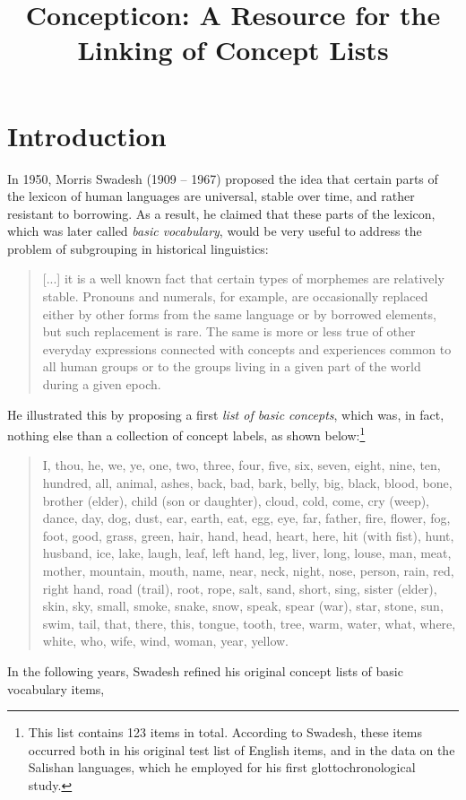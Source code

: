 \documentclass[10pt, a4paper]{article}
\title{Concepticon: A Resource for the Linking of Concept Lists}
\begin{document}
\maketitleabstract

\section{Introduction}
\noindent In 1950, Morris Swadesh (1909 -- 1967) proposed the idea that certain parts of the lexicon of human
languages are universal, stable over time, and rather resistant to borrowing. As a result, he
claimed that these
parts of the lexicon, which was later called \emph{basic vocabulary}, would be very
useful to address the problem of subgrouping in historical linguistics:
\begin{quote}
[...] it is a well known fact that certain types of morphemes are relatively stable. Pronouns and
numerals, for example, are occasionally replaced either by other forms from the same language or by
borrowed elements, but such replacement is rare. The same is more or less true of other everyday
expressions connected with concepts and experiences common to all human groups or to the groups
living in a given part of the world during a given epoch. \cite[157]{Swadesh1950}
\end{quote}
He illustrated this by proposing a first \emph{list of basic concepts}, which was, in fact, nothing
else than a collection of concept labels, as shown below:\footnote{This list contains 123 items in
total. According to Swadesh, these items occurred both in his original test list of English items,
and in the data on the Salishan languages, which he employed for his first glottochronological
study.}
\begin{quote}
I, thou, he, we, ye, one, two, three, four, five,
six, seven, eight, nine, ten, hundred, all,
animal, ashes, back, bad, bark, belly, big,
black, blood, bone, brother (elder), child
(son or daughter), cloud, cold, come, cry
(weep), dance, day, dog, dust, ear, earth, eat,
egg, eye, far, father, fire, flower, fog, foot,
good, grass, green, hair, hand, head, heart,
here, hit (with fist), hunt, husband, ice,
lake, laugh, leaf, left hand, leg, liver, long,
louse, man, meat, mother, mountain, mouth,
name, near, neck, night, nose, person, rain,
red, right hand, road (trail), root, rope, salt,
sand, short, sing, sister (elder), skin, sky,
small, smoke, snake, snow, speak, spear
(war), star, stone, sun, swim, tail, that, there,
this, tongue, tooth, tree, warm, water, what,
where, white, who, wife, wind, woman, year,
yellow. \cite[161]{Swadesh1950}
\end{quote}
In the following years, Swadesh refined his original concept lists of basic vocabulary items,
\end{document}
